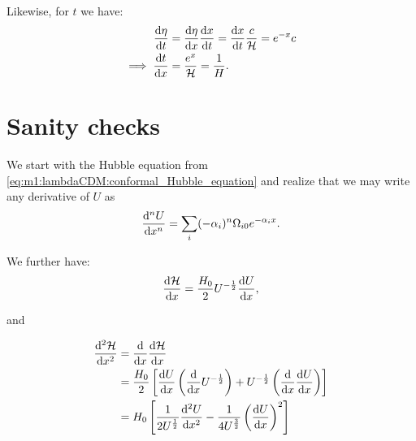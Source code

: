     Likewise, for $t$ we have:
    \begin{equation}
        \begin{split}
            \dv{\eta}{t} &= \dv{\eta}{x}\dv{x}{t} = \dv{x}{t}\frac{c}{\mathcal{H}} = e^{-x}c\\
            \implies \dv{t}{x} &= \frac{e^x}{\mathcal{H}} = \frac{1}{H}.
        \end{split}
    \end{equation}


\section{Sanity checks}\label{app:sanity}
    We start with the Hubble equation from \cref{eq:m1:lambdaCDM:conformal_Hubble_equation} and realize that we may write any derivative of $U$ as
    \begin{equation}
        \dv[n]{U}{x} = \sum_i(-\alpha_i)^n\Omega_{i0}e^{-\alpha_ix}.
    \end{equation}

    We further have:
    \begin{equation}
        \dv{\mathcal{H}}{x} = \frac{H_0}{2}U^{-\frac{1}{2}}\dv{U}{x},
    \end{equation}

    and
    
    \begin{equation}
        \begin{split}
            \dv[2]{\mathcal{H}}{x} &= \dv{}{x}\dv{\mathcal{H}}{x}\\
            &= \frac{H_0}{2}\left[\dv{U}{x}\left(\dv{}{x}U^{-\frac{1}{2}}\right) + U^{-\frac{1}{2}}\left(\dv{}{x}\dv{U}{x}\right)\right]\\
            &=H_0\left[\frac{1}{2U^{\frac{1}{2}}}\dv[2]{U}{x} - \frac{1}{4U^{\frac{3}{2}}}\left(\dv{U}{x}\right)^2\right]
        \end{split}
    \end{equation}


